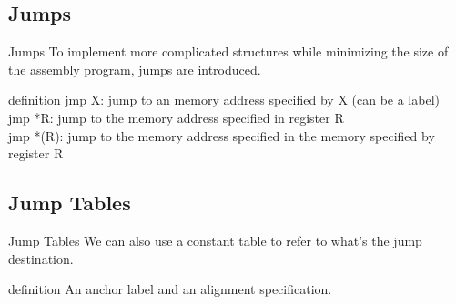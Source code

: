 \documentclass{beamer}
\newtheorem{rmk}{Remark}
\begin{document}
        \subsection{Jumps}
        \begin{frame}{Jumps}
            To implement more complicated structures while minimizing the size of the assembly program, jumps are introduced.
            \begin{block}{definition}
                jmp X: jump to an memory address specified by X (can be a label)\\
                jmp *R: jump to the memory address specified in register R\\
                jmp *(R): jump to the memory address specified in the memory specified by register R
            \end{block}
        \end{frame}
        \subsection{Jump Tables}
        \begin{frame}{Jump Tables}
            We can also use a constant table to refer to what's the jump destination.
            \begin{block}{definition}
                An anchor label and an alignment specification.
            \end{block}
        \end{frame}
\end{document}
